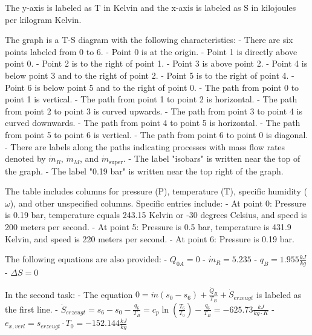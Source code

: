 The y-axis is labeled as T in Kelvin and the x-axis is labeled as S in kilojoules per kilogram Kelvin.

The graph is a T-S diagram with the following characteristics:
- There are six points labeled from 0 to 6.
- Point 0 is at the origin.
- Point 1 is directly above point 0.
- Point 2 is to the right of point 1.
- Point 3 is above point 2.
- Point 4 is below point 3 and to the right of point 2.
- Point 5 is to the right of point 4.
- Point 6 is below point 5 and to the right of point 0.
- The path from point 0 to point 1 is vertical.
- The path from point 1 to point 2 is horizontal.
- The path from point 2 to point 3 is curved upwards.
- The path from point 3 to point 4 is curved downwards.
- The path from point 4 to point 5 is horizontal.
- The path from point 5 to point 6 is vertical.
- The path from point 6 to point 0 is diagonal.
- There are labels along the paths indicating processes with mass flow rates denoted by \( \dot{m}_R \), \( \dot{m}_M \), and \( \dot{m}_{\text{super}} \).
- The label "isobars" is written near the top of the graph.
- The label "0.19 bar" is written near the top right of the graph.

The table includes columns for pressure (P), temperature (T), specific humidity (\(\omega\)), and other unspecified columns. Specific entries include:
- At point 0: Pressure is 0.19 bar, temperature equals 243.15 Kelvin or -30 degrees Celsius, and speed is 200 meters per second.
- At point 5: Pressure is 0.5 bar, temperature is 431.9 Kelvin, and speed is 220 meters per second.
- At point 6: Pressure is 0.19 bar.

The following equations are also provided:
- \(Q_{0A} = 0\)
- \(\dot{m}_R = 5.235\)
- \(q_B = 1.955 \frac{kJ}{kg}\)
- \(\Delta S = 0\)

In the second task:
- The equation \(0 = \dot{m} (s_0 - s_6) + \frac{\dot{Q}_B}{T_B} + \dot{S}_{erzeugt}\) is labeled as the first line.
- \(\dot{S}_{erzeugt} = s_6 - s_0 - \frac{q_6}{T_B} = c_p \ln \left( \frac{T_6}{T_0} \right) - \frac{q_6}{T_B} = -625.73 \frac{kJ}{kg \cdot K}\)
- \(e_{x,verl} = s_{erzeugt} \cdot T_0 = -152.144 \frac{kJ}{kg}\)